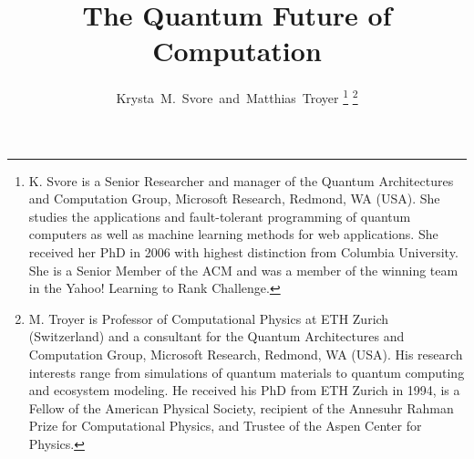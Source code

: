 \documentclass[journal]{IEEEtran}
\begin{document}
%
\title{The Quantum Future of Computation}
%
%
%

\author{Krysta~M.~Svore~and~Matthias~Troyer%
\thanks{K. Svore is a Senior Researcher and manager of the Quantum Architectures and Computation Group, Microsoft Research, Redmond, WA (USA).  She studies the applications and fault-tolerant programming of quantum computers as well as machine learning methods for web applications.  She received her PhD in 2006 with highest distinction from Columbia University.  She is a Senior Member of the ACM and was a member of the winning team in the Yahoo! Learning to Rank Challenge. }%
\thanks{M. Troyer is Professor of Computational Physics at ETH Zurich (Switzerland)  and a consultant for the Quantum Architectures and Computation Group, Microsoft Research, Redmond, WA (USA). His research interests range from simulations of quantum materials to quantum computing and ecosystem modeling. He received his PhD from ETH Zurich in 1994, is a Fellow of the American Physical Society, recipient of the Annesuhr Rahman Prize for Computational Physics, and Trustee of the Aspen Center for Physics.}%
}

% 
%
\end{document}

